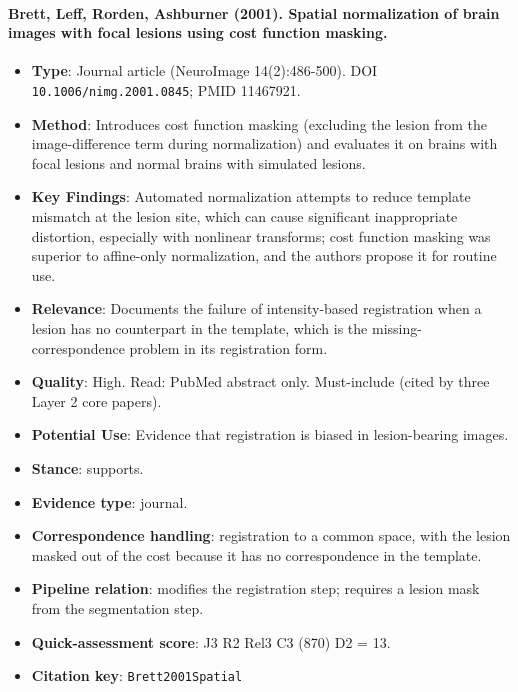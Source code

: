 \documentclass[journal,onecolumn]{IEEEtran}
\begin{document}
\paragraph{Brett, Leff, Rorden, Ashburner (2001). Spatial normalization of brain images with focal lesions using cost function masking.~\cite{Brett2001Spatial}}\mbox{}

\begin{itemize}

\item{} \textbf{Type}: Journal article (NeuroImage 14(2):486-500). DOI \nolinkurl{10.1006/nimg.2001.0845}; PMID 11467921.

\item{} \textbf{Method}: Introduces cost function masking (excluding the lesion from the image-difference term during normalization) and evaluates it on brains with focal lesions and normal brains with simulated lesions.

\item{} \textbf{Key Findings}: Automated normalization attempts to reduce template mismatch at the lesion site, which can cause significant inappropriate distortion, especially with nonlinear transforms; cost function masking was superior to affine-only normalization, and the authors propose it for routine use.

\item{} \textbf{Relevance}: Documents the failure of intensity-based registration when a lesion has no counterpart in the template, which is the missing-correspondence problem in its registration form.

\item{} \textbf{Quality}: High. Read: PubMed abstract only. Must-include (cited by three Layer 2 core papers).

\item{} \textbf{Potential Use}: Evidence that registration is biased in lesion-bearing images.

\item{} \textbf{Stance}: supports.

\item{} \textbf{Evidence type}: journal.

\item{} \textbf{Correspondence handling}: registration to a common space, with the lesion masked out of the cost because it has no correspondence in the template.

\item{} \textbf{Pipeline relation}: modifies the registration step; requires a lesion mask from the segmentation step.

\item{} \textbf{Quick-assessment score}: J3 R2 Rel3 C3 (870) D2 = 13.

\item{} \textbf{Citation key}: \texttt{Brett2001Spatial}

\end{itemize}
\end{document}
